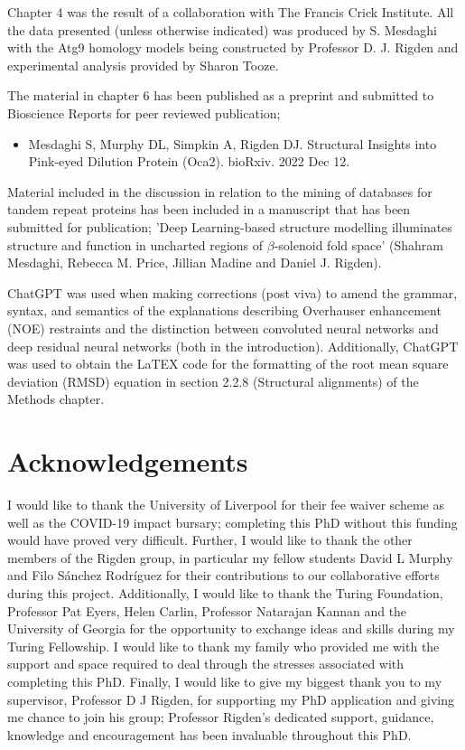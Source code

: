 \documentclass[a4paper,oneside,12pt]{book}
\begin{document}
Chapter 4 was the result of a collaboration with The Francis Crick Institute.  All the data presented (unless otherwise indicated) was produced by S. Mesdaghi with the Atg9 homology models being constructed by Professor D. J. Rigden and experimental analysis provided by Sharon Tooze.

The material in chapter 6 has been published as a preprint and submitted to Bioscience Reports for peer reviewed publication;

\begin{itemize}
  \item Mesdaghi S, Murphy DL, Simpkin A, Rigden DJ. Structural Insights into Pink-eyed Dilution Protein (Oca2). bioRxiv. 2022 Dec 12.

\end{itemize}

Material included in the discussion in relation to the  mining of databases for tandem repeat proteins has been included in a manuscript that has been submitted for publication;
'Deep Learning-based structure modelling illuminates structure and function in uncharted regions of $\beta$-solenoid fold space' (Shahram Mesdaghi, Rebecca M. Price, Jillian Madine and Daniel J. Rigden). 

ChatGPT was used when making corrections (post viva) to amend the grammar, syntax, and semantics of the explanations describing Overhauser enhancement (NOE) restraints and the distinction between convoluted neural networks and deep residual neural networks (both in the introduction).  Additionally, ChatGPT was used to obtain the LaTEX code for the formatting of the root mean square deviation (RMSD) equation in section 2.2.8 (Structural alignments) of the Methods chapter.


\newpage
\chapter{Acknowledgements}
I would like to thank the University of Liverpool for their fee waiver scheme as well as the COVID-19 impact bursary; completing this PhD without this funding would have proved very difficult.  Further, I would like to thank the other members of the Rigden group, in particular my fellow students David L Murphy and Filo Sánchez Rodríguez for their contributions to our collaborative efforts during this project.  Additionally, I would like to thank the Turing Foundation, Professor Pat Eyers, Helen Carlin, Professor Natarajan Kannan and the University of Georgia for the opportunity to exchange ideas and skills during my Turing Fellowship.  I would like to thank my family who provided me with the support and space required to deal through the stresses associated with completing this PhD.  Finally, I would like to give my biggest thank you to my supervisor, Professor D J Rigden, for supporting my PhD application and giving me chance to join his group; Professor Rigden's dedicated support, guidance, knowledge and encouragement has been invaluable throughout this PhD. 
\end{document}
